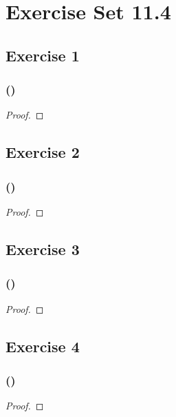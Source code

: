 \documentclass[14pt]{extarticle}
\begin{document}
\section{Exercise Set 11.4}

\subsection{Exercise 1}

\subsubsection{()}

\begin{proof}

\end{proof}

\subsection{Exercise 2}

\subsubsection{()}

\begin{proof}

\end{proof}

\subsection{Exercise 3}

\subsubsection{()}

\begin{proof}

\end{proof}

\subsection{Exercise 4}

\subsubsection{()}

\begin{proof}

\end{proof}
\end{document}

